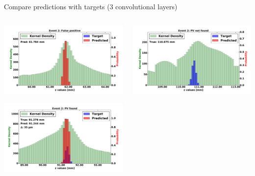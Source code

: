 \begin{frame}{Compare predictions with targets (3 convolutional layers)}
  \begin{columns}[c]
        \begin{center}
            \includegraphics[width=1\textwidth,height=0.45\textwidth, trim=18 0 18 0]{images/120000_3layer_12.pdf}

            \includegraphics[width=1\textwidth, height=0.45\textwidth,trim=18 0 18 0]{images/120000_3layer_13.pdf}

        \end{center}
        \begin{center}
           \includegraphics[width=1\textwidth, height=0.45\textwidth, trim=18 0 18 0]{images/120000_3layer_14.pdf}


\end{center}
\end{columns}
\end{frame}

